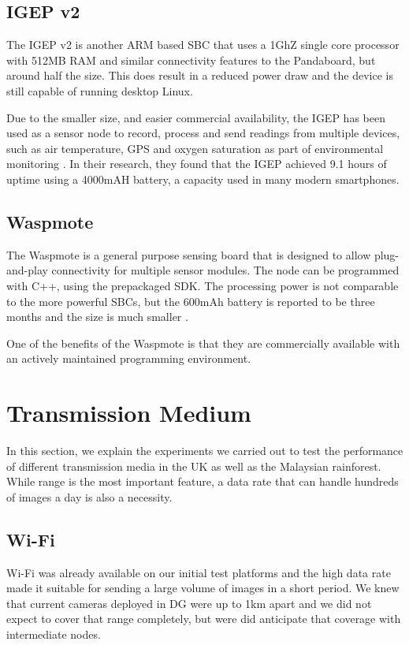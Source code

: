\subsection{IGEP v2}

The IGEP v2 is another ARM based SBC that uses a 1GhZ single core processor with 512MB RAM and similar connectivity features to the Pandaboard, but around half the size. This does result in a reduced power draw and the device is still capable of running desktop Linux.

Due to the smaller size, and easier commercial availability, the IGEP has been used as a sensor node to record, process and send readings from multiple devices, such as air temperature, GPS and oxygen saturation as part of environmental monitoring \cite{Resch}. In their research, they found that the IGEP achieved 9.1 hours of uptime using a 4000mAH battery, a capacity used in many modern smartphones.

\subsection{Waspmote}
The Waspmote is a general purpose sensing board that is designed to allow plug-and-play connectivity for multiple sensor modules. The node can be programmed with C++, using the prepackaged SDK. The processing power is not comparable to the more powerful SBCs, but the 600mAh battery is reported to be three months and the size is much smaller \cite{Lib}.

One of the benefits of the Waspmote is that they are commercially available with an actively maintained programming environment.

\section{Transmission Medium}
	In this section, we explain the experiments we carried out to test the performance of different transmission media in the UK as well as the Malaysian rainforest. While range is the most important feature, a data rate that can handle hundreds of images a day is also a necessity.

\subsection{Wi-Fi}\label{tech:wifirange}
Wi-Fi was already available on our initial test platforms and the high data rate made it suitable for sending a large volume of images in a short period. We knew that current cameras deployed in DG were up to 1km apart and we did not expect to cover that range completely, but were did anticipate that coverage with intermediate nodes.

